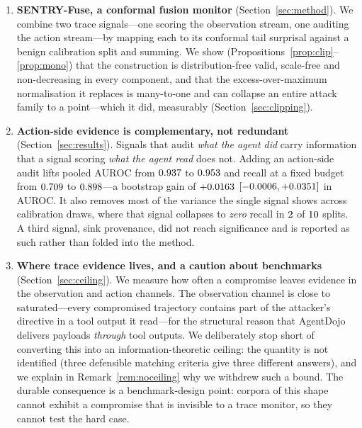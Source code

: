 \documentclass[preprint,12pt,authoryear]{elsarticle}
\theoremstyle{definition}
\begin{document}
\begin{enumerate}
\item \textbf{SENTRY-Fuse, a conformal fusion monitor}
(Section~\ref{sec:method}). We combine two trace signals---one scoring the
observation stream, one auditing the action stream---by mapping each to its
conformal tail surprisal against a benign calibration split and summing. We show
(Propositions~\ref{prop:clip}--\ref{prop:mono}) that the construction is
distribution-free valid, scale-free and non-decreasing in every component, and
that the excess-over-maximum normalisation it replaces is many-to-one and can
collapse an entire attack family to a point---which it did, measurably
(Section~\ref{sec:clipping}).

\item \textbf{Action-side evidence is complementary, not redundant}
(Section~\ref{sec:results}). Signals that audit \emph{what the agent did} carry
information that a signal scoring \emph{what the agent read} does not. Adding
an action-side audit lifts pooled $\mathrm{AUROC}$ from $0.937$ to
$0.953$ and recall at a fixed budget from $0.709$ to
$0.898$---a bootstrap gain of $+0.0163$
$[-0.0006, +0.0351]$ in AUROC. It also removes most of the
variance the single signal shows across calibration draws, where that signal
collapses to \emph{zero} recall in $2$ of $10$ splits. A third
signal, sink provenance, did not reach significance and is reported as such rather
than folded into the method.

\item \textbf{Where trace evidence lives, and a caution about benchmarks}
(Section~\ref{sec:ceiling}). We measure how often a compromise leaves evidence in
the observation and action channels. The observation channel is close to
saturated---every compromised trajectory contains part of the attacker's directive
in a tool output it read---for the structural reason that AgentDojo delivers
payloads \emph{through} tool outputs. We deliberately stop short of converting
this into an information-theoretic ceiling: the quantity is not identified (three
defensible matching criteria give three different answers), and we explain in
Remark~\ref{rem:noceiling} why we withdrew such a bound.
The durable consequence is a benchmark-design point: corpora of this
shape cannot exhibit a compromise that is invisible to a trace monitor, so they
cannot test the hard case.


\end{enumerate}
\end{document}
